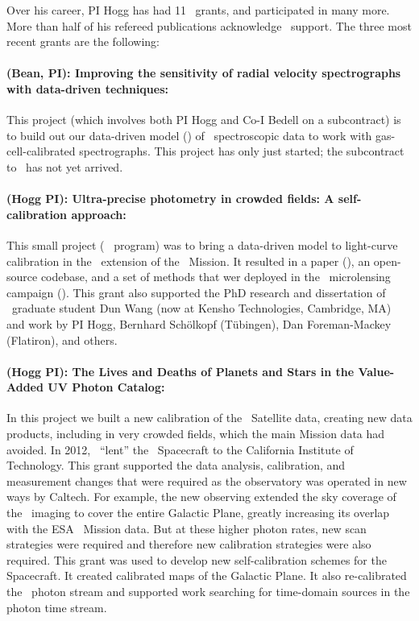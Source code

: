 \documentclass[12pt, letterpaper]{article}
\begin{document}

Over his career, PI Hogg has had 11 \NASA\ grants, and participated in
many more.
More than half of his refereed publications acknowledge \NASA\ support.
The three most recent grants are the following:

\paragraph{ (Bean, PI):
Improving the sensitivity of radial velocity spectrographs with data-driven techniques:}
This project (which involves both PI Hogg and Co-I Bedell on a subcontract)
is to
build out our data-driven model (\wobble) of \EPRV\ spectroscopic data
to work with gas-cell-calibrated spectrographs. This project has only
just started; the subcontract to \NYU\ has not yet arrived.

\paragraph{ (Hogg PI):
Ultra-precise photometry in crowded fields: A self-calibration approach:}
This small project (\Ktwo\  program)
was to bring a data-driven model to light-curve calibration
in the \Ktwo\ extension of the \Kepler\ Mission.
It resulted in a paper (\citealt{CPMdiff}), an open-source codebase,
and a set of methods that wer deployed in the \Ktwo\ microlensing campaign (\citealt{K2C9}).
This grant also supported the PhD research and dissertation of \NYU\ graduate
student Dun Wang (now at Kensho Technologies, Cambridge, MA) and work
by PI Hogg, Bernhard Sch\"olkopf (T\"ubingen), Dan Foreman-Mackey
(Flatiron), and others.

\paragraph{ (Hogg PI):
The Lives and Deaths of Planets and Stars in the Value-Added UV Photon Catalog:}
In this project we built a new calibration of the \GALEX\ Satellite
data, creating new data products, including in very crowded fields,
which the main Mission data had avoided.
In 2012, \NASA\ ``lent'' the \GALEX\ Spacecraft to the California Institute of Technology.
This grant supported the data analysis, calibration, and measurement
changes that were required as the observatory was operated in new
ways by Caltech.
For example, the new observing extended the sky coverage of the \GALEX\ imaging to
cover the entire Galactic Plane, greatly increasing its overlap with
the ESA \Gaia\ Mission data.
But at these higher photon rates, new scan strategies were required and therefore
new calibration strategies were also required.
This grant was used to develop new self-calibration schemes for the Spacecraft.
It created calibrated maps of the Galactic Plane.
It also re-calibrated the \GALEX\ photon stream and supported work
searching for time-domain sources in the photon time stream.
\end{document}
